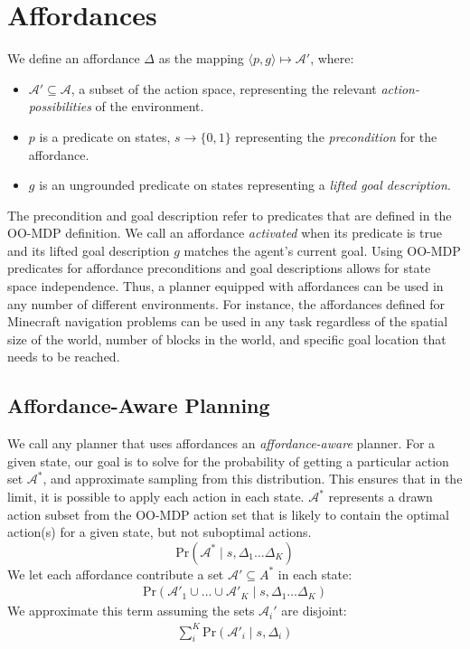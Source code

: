 \documentclass[letterpaper]{article}
\begin{document}
\section{Affordances}
\label{sec:affordances}

We define an affordance $\Delta$ 
as the mapping $\langle p,g\rangle \longmapsto \mathcal{A}'$,
where:
\begin{itemize}
\item[] $\mathcal{A}' \subseteq \mathcal{A}$, a subset of the action space, representing the relevant {\it action-possibilities} of the environment.
\item[] $p$ is a predicate on states, $s \longrightarrow \{$0$, 1\}$
  representing the {\em precondition} for the affordance.
\item[] $g$ is an ungrounded predicate on states representing a {\it lifted goal description}.
\end{itemize}
The precondition and goal description refer to predicates that are defined in the OO-MDP definition.
We call an affordance {\it activated} when its predicate is true and its lifted goal description $g$ matches the agent's current goal. 
Using OO-MDP predicates for affordance preconditions and goal descriptions 
allows for state space independence. Thus, a planner equipped with
affordances can be used in any number of different environments. For instance, the affordances defined for Minecraft 
navigation problems can be used in any task regardless of the spatial size of the world, 
number of blocks in the world, and specific goal location that needs to be reached.

\subsection{Affordance-Aware Planning}
We call any planner that
uses affordances an {\it affordance-aware} planner. For a given state, 
our goal is to solve for the probability of getting a particular action set $\mathcal{A}^*$, and approximate sampling
from this distribution. This ensures that in the limit, it is possible to apply each action in each state. $\mathcal{A}^*$ represents
a drawn action subset from the OO-MDP action set that is likely to contain the optimal action(s) for a given state,
but not suboptimal actions.
\begin{equation}
\text{Pr}(\mathcal{A}^* \mid s, \Delta_1 \dots \Delta_K)
\end{equation}
We let each affordance contribute a set $\mathcal{A}' \subseteq A^*$ in each state:
\begin{align}
\text{Pr}(\mathcal{A}'_1 \cup \ldots \cup \mathcal{A}'_K \mid s, \Delta_1 \dots \Delta_K)
\end{align}
We approximate this term assuming the sets $\mathcal{A}_i'$ are disjoint:
\begin{align}
\sum_i^K \text{Pr}(\mathcal{A}'_i \mid s, \Delta_i)
\end{align}
\end{document}
